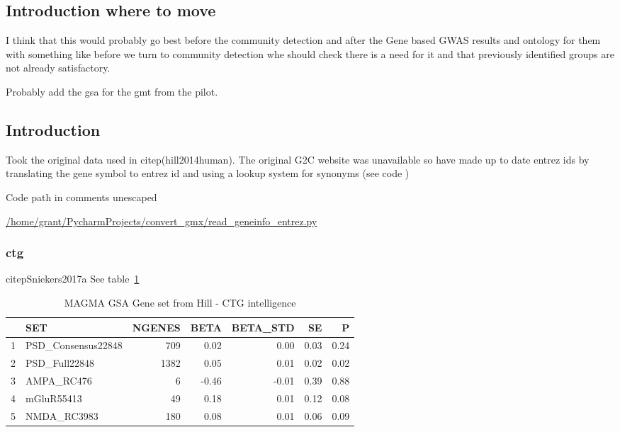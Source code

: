 \subsection{Introduction where to move}
I think that this would probably go best before the community detection and after the Gene based GWAS results and ontology for them with something like before we turn to community detection whe should check there is a need for it and that previously identified groups are not already satisfactory. 

Probably add the gsa for the gmt from the pilot.
\subsection{Introduction}
Took the original data used in  citep(hill2014human). The original G2C website was unavailable so have made up to date entrez ids by translating the gene symbol to entrez id and using a lookup system for synonyms (see code )

Code path in comments unescaped

\url{/home/grant/PycharmProjects/convert_gmx/read_geneinfo_entrez.py} 

\subsubsection{ctg}
citep{Sniekers2017a}
See table~\ref{table:MAGMA_GSA_HILL_SET_SNEIKERS}
\begin{table}[ht]
\centering
\begin{tabular}{rlrrrrr}
  \hline
 & SET & NGENES & BETA & BETA\_STD & SE & P \\ 
  \hline
1 & PSD\_Consensus22848 & 709 & 0.02 & 0.00 & 0.03 & 0.24 \\ 
  2 & PSD\_Full22848 & 1382 & 0.05 & 0.01 & 0.02 & 0.02 \\ 
  3 & AMPA\_RC476 &   6 & -0.46 & -0.01 & 0.39 & 0.88 \\ 
  4 & mGluR55413 &  49 & 0.18 & 0.01 & 0.12 & 0.08 \\ 
  5 & NMDA\_RC3983 & 180 & 0.08 & 0.01 & 0.06 & 0.09 \\ 
   \hline
\end{tabular}
\caption{MAGMA GSA Gene set from Hill - CTG intelligence}
\label{table:MAGMA_GSA_HILL_SET_SNEIKERS}
\end{table}

